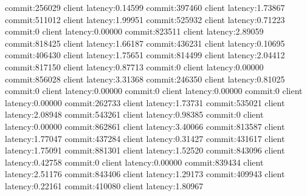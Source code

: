 commit:256029 client latency:0.14599
commit:397460 client latency:1.73867
commit:511012 client latency:1.99951
commit:525932 client latency:0.71223
commit:0 client latency:0.00000
commit:823511 client latency:2.89059
commit:818425 client latency:1.66187
commit:436231 client latency:0.10695
commit:406430 client latency:1.75651
commit:814499 client latency:2.04412
commit:817150 client latency:0.87713
commit:0 client latency:0.00000
commit:856028 client latency:3.31368
commit:246350 client latency:0.81025
commit:0 client latency:0.00000
commit:0 client latency:0.00000
commit:0 client latency:0.00000
commit:262733 client latency:1.73731
commit:535021 client latency:2.08948
commit:543261 client latency:0.98385
commit:0 client latency:0.00000
commit:862861 client latency:3.40066
commit:813587 client latency:1.77047
commit:437284 client latency:0.31427
commit:431617 client latency:1.75091
commit:881301 client latency:1.52520
commit:843096 client latency:0.42758
commit:0 client latency:0.00000
commit:839434 client latency:2.51176
commit:843406 client latency:1.29173
commit:409943 client latency:0.22161
commit:410080 client latency:1.80967